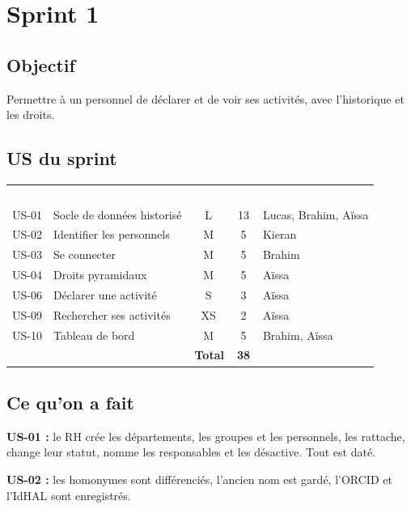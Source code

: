 \documentclass[11pt,a4paper]{article}
\newcommand{\entete}[1]{\textcolor{white}{\textbf{#1}}}
\begin{document}
\section{Sprint 1}

\subsection{Objectif}

Permettre à un personnel de déclarer et de voir ses activités, avec l'historique et les droits.

\subsection{US du sprint}

\begin{center}
\begin{tabular}{c p{6cm} c c p{3.6cm}}
\rowcolor{bleu} \entete{US} & \entete{Intitulé} & \entete{Taille} & \entete{SP} & \entete{Qui} \\
US-01 & Socle de données historisé & L & 13 & Lucas, Brahim, Aïssa \\
\rowcolor{grisclair} US-02 & Identifier les personnels & M & 5 & Kieran \\
US-03 & Se connecter & M & 5 & Brahim \\
\rowcolor{grisclair} US-04 & Droits pyramidaux & M & 5 & Aïssa \\
US-06 & Déclarer une activité & S & 3 & Aïssa \\
\rowcolor{grisclair} US-09 & Rechercher ses activités & XS & 2 & Aïssa \\
US-10 & Tableau de bord & M & 5 & Brahim, Aïssa \\
\multicolumn{3}{r}{\textbf{Total}} & \textbf{38} & \\
\end{tabular}
\end{center}

\subsection{Ce qu'on a fait}

\textbf{US-01 :} le RH crée les départements, les groupes et les personnels, les rattache, change leur statut, nomme les responsables et les désactive. Tout est daté.

\textbf{US-02 :} les homonymes sont différenciés, l'ancien nom est gardé, l'ORCID et l'IdHAL sont enregistrés.
\end{document}
